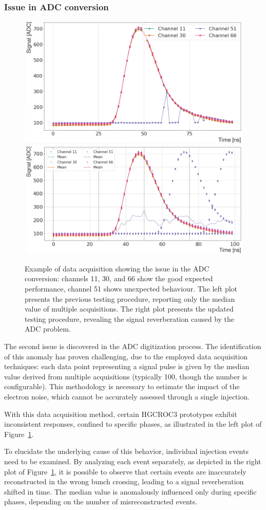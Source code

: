 \subsubsection{Issue in ADC conversion}
\label{subsubsec:Issue in ADC conversion}

\begin{figure}[b]
    \centering
    \includegraphics[height=0.25\linewidth]{Figures/HGCAL/ADCIssue_Median.pdf}
    \includegraphics[height=0.25\linewidth]{Figures/HGCAL/ADCIssue_Raw.pdf}
    \caption{Example of data acquisition showing the issue in the ADC conversion: channels 11, 30, and 66 show the good expected performance, channel 51 shows unexpected behaviour. The left plot presents the previous testing procedure, reporting only the median value of multiple acquisitions. The right plot presents the updated testing procedure, revealing the signal reverberation caused by the ADC problem.}
    \label{fig:ADCIssue}
\end{figure}

The second issue is discovered in the ADC digitization process. The identification of this anomaly has proven challenging, due to the employed data acquisition techniques: each data point representing a signal pulse is given by the median value derived from multiple acquisitions (typically 100, though the number is configurable). This methodology is necessary to estimate the impact of the electron noise, which cannot be accurately assessed through a single injection.

With this data acquisition method, certain HGCROC3 prototypes exhibit inconsistent responses, confined to specific phases, as illustrated in the left plot of Figure~\ref{fig:ADCIssue}.

To elucidate the underlying cause of this behavior, individual injection events need to be examined. By analyzing each event separately, as depicted in the right plot of Figure~\ref{fig:ADCIssue}, it is possible to observe that certain events are inaccurately reconstructed in the wrong bunch crossing, leading to a signal reverberation shifted in time. The median value is anomalously influenced only during specific phases, depending on the number of misreconstructed events.

